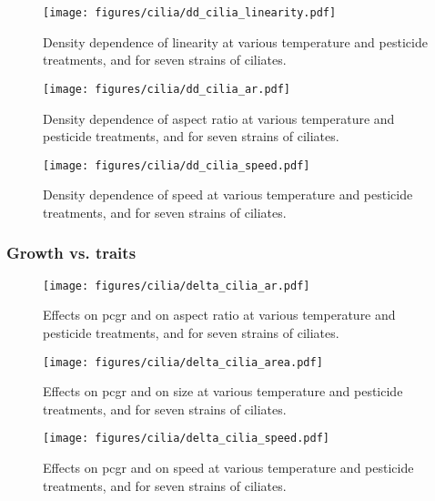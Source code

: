 \begin{figure}[hbt!]
    \centering
    \texttt{[image: figures/cilia/dd\_cilia\_linearity.pdf]}
    \caption{Density dependence of linearity at various temperature and pesticide treatments, and for seven strains of ciliates.}
    \label{fig:dd_cilia_linearity}
\end{figure}

\begin{figure}[hbt!]
    \centering
    \texttt{[image: figures/cilia/dd\_cilia\_ar.pdf]}
    \caption{Density dependence of aspect ratio at various temperature and pesticide treatments, and for seven strains of ciliates.}
    \label{fig:dd_cilia_ar}
\end{figure}

\begin{figure}[hbt!]
    \centering
    \texttt{[image: figures/cilia/dd\_cilia\_speed.pdf]}
    \caption{Density dependence of speed at various temperature and pesticide treatments, and for seven strains of ciliates.}
    \label{fig:dd_cilia_speed}
\end{figure}

\clearpage

\subsubsection{Growth vs. traits}

\begin{figure}[hbt!]
    \centering
    \texttt{[image: figures/cilia/delta\_cilia\_ar.pdf]}
    \caption{Effects on pcgr and on aspect ratio at various temperature and pesticide treatments, and for seven strains of ciliates.}
    \label{fig:delta_cilia_ar}
\end{figure}

\begin{figure}[hbt!]
    \centering
    \texttt{[image: figures/cilia/delta\_cilia\_area.pdf]}
    \caption{Effects on pcgr and on size at various temperature and pesticide treatments, and for seven strains of ciliates.}
    \label{fig:delta_cilia_area}
\end{figure}

\begin{figure}[hbt!]
    \centering
    \texttt{[image: figures/cilia/delta\_cilia\_speed.pdf]}
    \caption{Effects on pcgr and on speed at various temperature and pesticide treatments, and for seven strains of ciliates.}
    \label{fig:delta_cilia_speed}
\end{figure}

